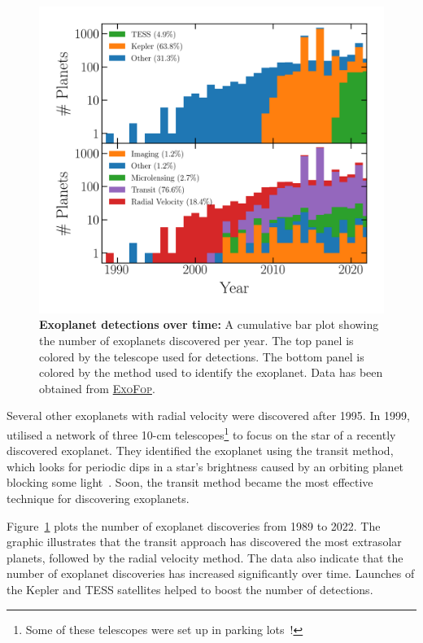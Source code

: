 \begin{figure}
\begin{center}
  \centerline{\includegraphics[width=1.\linewidth]{src/figures/confirmed_planets_vs_time.png}}
  \caption{\textbf{Exoplanet detections over time:} A cumulative bar plot showing the number of exoplanets discovered per year. The top panel is colored by the telescope used for detections. The bottom panel is colored by the method used to identify the exoplanet. Data has been obtained from \href{https://exoplanetarchive.ipac.caltech.edu/}{\textsc{ExoFop}}. }
  \label{fig:exo_detections_over_time}
\end{center}
\end{figure}


Several other exoplanets with radial velocity were discovered after 1995.
In 1999, \citet{charbonneau1999detection} utilised a network of three 10-cm telescopes\footnote{Some of these telescopes were set up in parking lots~\cite{david_exoplanet_parkinglot}!} to focus on the star of a recently discovered exoplanet.
They identified the exoplanet using the transit method, which looks for periodic dips in a star's brightness caused by an orbiting planet blocking some light~\cite{charbonneau1999detection}.
Soon, the transit method became the most effective technique for discovering exoplanets.

Figure~\ref{fig:exo_detections_over_time} plots the number of exoplanet discoveries from 1989 to 2022. 
The graphic illustrates that the transit approach has discovered the most extrasolar planets, followed by the radial velocity method.
The data also indicate that the number of exoplanet discoveries has increased significantly over time.
Launches of the Kepler and TESS satellites helped to boost the number of detections.

